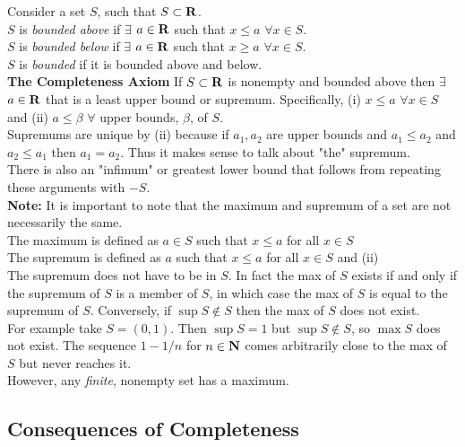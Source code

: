 \documentclass[12pt]{article}
\begin{document}
    Consider a set $S$, such that $S \subset \mathbf{R}$.\\
    $S$ is \emph{bounded above} if $\exists$ $a \in \mathbf{R}$ such that $x \leq a$ $\forall x \in S$.\\
    $S$ is \emph{bounded below} if $\exists$ $a \in \mathbf{R}$ such that $x \geq a$ $\forall x \in S$.\\
    $S$ is \emph{bounded} if it is bounded above and below.\\

    \textbf{The Completeness Axiom} If $S \subset \mathbf{R}$ is nonempty and bounded above then $\exists$ $a \in \mathbf{R}$
    that is a least upper bound or supremum. Specifically, (i) $x \leq a$ $\forall x \in S$ and (ii) $a \leq \beta$ $\forall$ 
    upper bounds, $\beta$, of $S$.\\

    Supremums are unique by (ii) because if $a_1,a_2$ are upper bounds and $a_1 \leq a_2$ and $a_2 \leq a_1$ then $a_1 = a_2$.
    Thus it makes sense to talk about "the" supremum.\\

    There is also an "infimum" or greatest lower bound that follows from repeating these arguments with $-S$.\\

    \textbf{Note:} It is important to note that the maximum and supremum of a set are not necessarily the same.\\

      The maximum is defined as $a \in S$ such that $x \leq a$ for all $x \in S$\\
      The supremum is defined as $a$ such that $x \leq a$ for all $x \in S$ and (ii)\\

      The supremum does not have to be in $S$. In fact the max of $S$ exists if and only if the supremum of $S$
      is a member of $S$, in which case the max of $S$ is equal to the supremum of $S$. Conversely, if $\sup S \notin S$ then
      the max of $S$ does not exist.\\

      For example take $S = (0,1)$. Then $\sup S = 1$ but $\sup S \notin S$, so $\max S$ does not exist. The sequence
      $1 - 1/n$ for $n \in \mathbf{N}$ comes arbitrarily close to the max of $S$ but never reaches it.\\

      However, any \emph{finite}, nonempty set has a maximum.
  \subsection{Consequences of Completeness}
\end{document}
